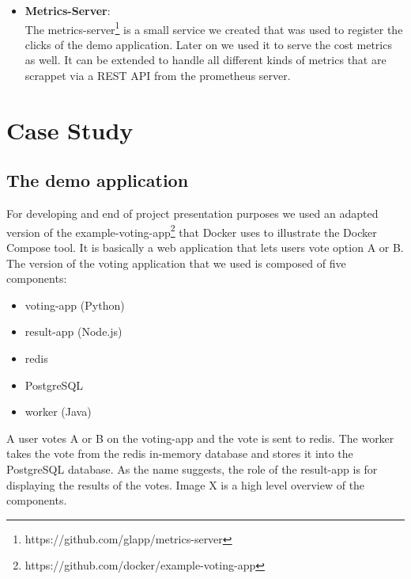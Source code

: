 \documentclass{seal_thesis}
\begin{document}
\begin{itemize}
	It is based on an example application by Docker itself\footnote{https://blog.docker.com/2015/11/docker-toolbox-compose/}.
	We adjusted the individual components to our needs, e.g. to include custom metrics, and they can all be found on our github page.
	\item \textbf{Metrics-Server}: \\
	The metrics-server\footnote{https://github.com/glapp/metrics-server} is a small service we created that was used to register the clicks of the demo application. Later on we used it to serve the cost metrics as well.
	It can be extended to handle all different kinds of metrics that are scrappet via a REST API from the prometheus server.
\end{itemize}


\chapter{Case Study}\label{ch:casestudy}

\section{The demo application}
For developing and end of project presentation purposes we used an adapted version of the example-voting-app\footnote{https://github.com/docker/example-voting-app} that Docker uses to illustrate the Docker Compose tool.
It is basically a web application that lets users vote option A or B.
The version of the voting application that we used is composed of five components:
\begin{itemize}
	\item voting-app (Python)
	\item result-app (Node.js)
	\item redis
	\item PostgreSQL
	\item worker (Java)
\end{itemize}
A user votes A or B on the voting-app and the vote is sent to redis.
The worker takes the vote from the redis in-memory database and stores it into the PostgreSQL database.
As the name suggests, the role of the result-app is for displaying the results of the votes.
Image X  is a high level overview of the components.
\end{document}
